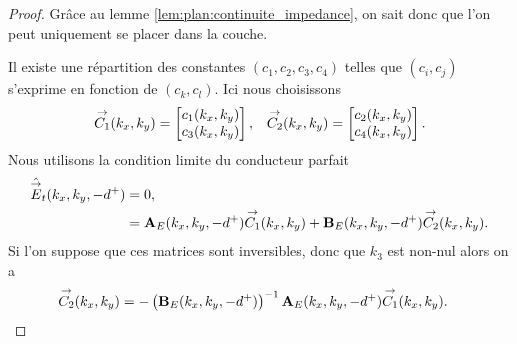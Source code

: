         \begin{proof}
            Grâce au lemme \eqref{lem:plan:continuite_impedance}, on sait donc que l'on peut uniquement se placer dans la couche.

            Il existe une répartition des constantes \((c_1,c_2,c_3,c_4)\) telles que \((c_i,c_j)\) s'exprime en fonction de \((c_k,c_l)\).
            Ici nous choisissons
            \begin{align*}
                {\overset{\rightarrow}{C_1}}(k_x,k_y) = \begin{bmatrix}c_1(k_x,k_y) \\ c_3(k_x,k_y)\end{bmatrix}, 
                && 
                {\overset{\rightarrow}{C_2}}(k_x,k_y) = \begin{bmatrix}c_2(k_x,k_y) \\ c_4(k_x,k_y)\end{bmatrix}.
            \end{align*}
            Nous utilisons la condition limite du conducteur parfait
            \begin{align*}
                \hat{{\overset{\rightarrow}{E}}}_t(k_x,k_y,-d^+) &= 0,
                \\
                &=  \mathbf{A}_E(k_x,k_y,-d^+){\overset{\rightarrow}{C_1}}(k_x,k_y) + \mathbf{B}_E(k_x,k_y,-d^+){\overset{\rightarrow}{C_2}}(k_x,k_y).
            \end{align*}
            Si l’on suppose que ces matrices sont inversibles, donc que \(k_3\) est non-nul alors on a
            \begin{align*}
                {\overset{\rightarrow}{C_2}}(k_x,k_y) &= -\left(\mathbf{B}_E(k_x,k_y,-d^+)\right)^{-1}\mathbf{A}_E(k_x,k_y,-d^+){\overset{\rightarrow}{C_1}}(k_x,k_y).
            \end{align*}

\end{proof}
